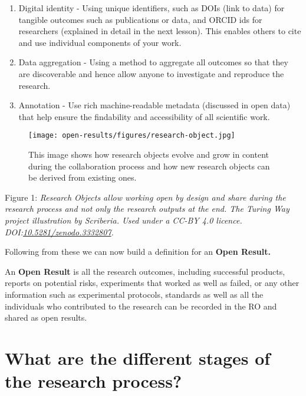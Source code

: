 \documentclass[
  letterpaper,
  DIV=11,
  numbers=noendperiod]{scrreport}
\providecommand{\tightlist}{%
  \setlength{\itemsep}{0pt}\setlength{\parskip}{0pt}}\usepackage{longtable,booktabs,array}
\begin{document}
\begin{enumerate}
\def\labelenumi{\arabic{enumi}.}
\tightlist
\item
  Digital identity - Using unique identifiers, such as DOIs (link to
  data) for tangible outcomes such as publications or data, and ORCID
  ids for researchers (explained in detail in the next lesson). This
  enables others to cite and use individual components of your work.
\item
  Data aggregation - Using a method to aggregate all outcomes so that
  they are discoverable and hence allow anyone to investigate and
  reproduce the research.
\item
  Annotation - Use rich machine-readable metadata (discussed in open
  data) that help ensure the findability and accessibility of all
  scientific work.
\end{enumerate}

\begin{figure}

{\centering \texttt{[image: open-results/figures/research-object.jpg]}

}

\caption{This image shows how research objects evolve and grow in
content during the collaboration process and how new research objects
can be derived from existing ones.}

\end{figure}

Figure 1: \emph{Research Objects allow working open by design and share
during the research process and not only the research outputs at the
end. The Turing Way project illustration by Scriberia. Used under a
CC-BY 4.0 licence.
DOI:}\href{https://doi.org/10.5281/zenodo.3332807}{\emph{10.5281/zenodo.3332807}}\emph{.}

Following from these we can now build a definition for an \textbf{Open
Result.}

An \textbf{Open Result} is all the research outcomes, including
successful products, reports on potential risks, experiments that worked
as well as failed, or any other information such as experimental
protocols, standards as well as all the individuals who contributed to
the research can be recorded in the RO and shared as open results.

\hypertarget{what-are-the-different-stages-of-the-research-process}{%
\section{What are the different stages of the research
process?}\label{what-are-the-different-stages-of-the-research-process}}
\end{document}
